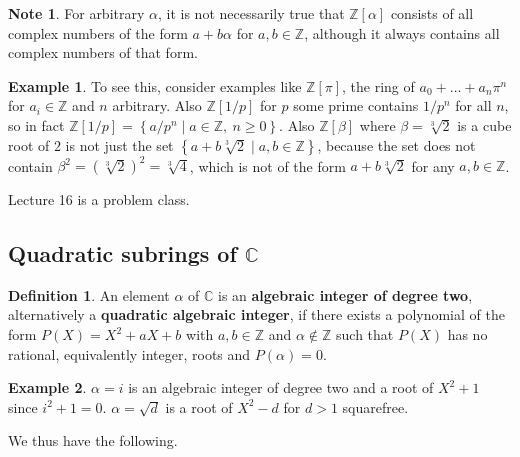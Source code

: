 \documentclass{article}
\newcommand{\Z}{\mathbb{Z}}
\newcommand{\C}{\mathbb{C}}
\newcommand{\rb}[1]{\left( #1 \right)}
\renewcommand{\sb}[1]{\left[ #1 \right]}
\newcommand{\cb}[1]{\left\{ #1 \right\}}
\theoremstyle{definition}\newtheorem{definition}{Definition}
\theoremstyle{definition}\newtheorem{remark}[definition]{Remark}
\theoremstyle{definition}\newtheorem*{example}{Example}
\theoremstyle{definition}\newtheorem*{note}{Note}
\begin{document}
\begin{note}
For arbitrary $ \alpha $, it is not necessarily true that $ \Z\sb{\alpha} $ consists of all complex numbers of the form $ a + b\alpha $ for $ a, b \in \Z $, although it always contains all complex numbers of that form.
\end{note}

\begin{example}
To see this, consider examples like $ \Z\sb{\pi} $, the ring of $ a_0 + \dots + a_n\pi^n $ for $ a_i \in \Z $ and $ n $ arbitrary. Also $ \Z\sb{1 / p} $ for $ p $ some prime contains $ 1 / p^n $ for all $ n $, so in fact $ \Z\sb{1 / p} = \cb{a / p^n \mid a \in \Z, \ n \ge 0} $. Also $ \Z\sb{\beta} $ where $ \beta = \sqrt[3]{2} $ is a cube root of $ 2 $ is not just the set $ \cb{a + b\sqrt[3]{2} \mid a, b \in \Z} $, because the set does not contain $ \beta^2 = \rb{\sqrt[3]{2}}^2 = \sqrt[3]{4} $, which is not of the form $ a + b\sqrt[3]{2} $ for any $ a, b \in \Z $.
\end{example}


Lecture 16 is a problem class.


\subsection{Quadratic subrings of $ \C $}

\begin{definition}
An element $ \alpha $ of $ \C $ is an \textbf{algebraic integer of degree two}, alternatively a \textbf{quadratic algebraic integer}, if there exists a polynomial of the form $ P\rb{X} = X^2 + aX + b $ with $ a, b \in \Z $ and $ \alpha \notin \Z $ such that $ P\rb{X} $ has no rational, equivalently integer, roots and $ P\rb{\alpha} = 0 $.
\end{definition}

\begin{example}
$ \alpha = i $ is an algebraic integer of degree two and a root of $ X^2 + 1 $ since $ i^2 + 1 = 0 $. $ \alpha = \sqrt{d} $ is a root of $ X^2 - d $ for $ d > 1 $ squarefree.
\end{example}

We thus have the following.
\end{document}
